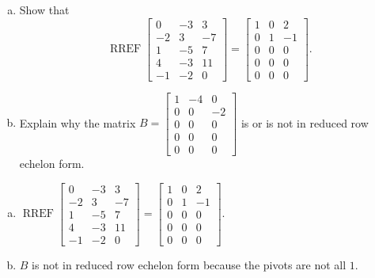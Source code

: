 
\begin{exerciseStatement}

\begin{enumerate}[(a)]
\item Show that \[\operatorname{RREF} \left[\begin{array}{ccc}
0 & -3 & 3 \\
-2 & 3 & -7 \\
1 & -5 & 7 \\
4 & -3 & 11 \\
-1 & -2 & 0
\end{array}\right] = \left[\begin{array}{ccc}
1 & 0 & 2 \\
0 & 1 & -1 \\
0 & 0 & 0 \\
0 & 0 & 0 \\
0 & 0 & 0
\end{array}\right] .\]
\item Explain why the matrix \(B= \left[\begin{array}{ccc}
1 & -4 & 0 \\
0 & 0 & -2 \\
0 & 0 & 0 \\
0 & 0 & 0 \\
0 & 0 & 0
\end{array}\right] \) is or is not in reduced row echelon form.
\end{enumerate}
    
\end{exerciseStatement}
    
\begin{exerciseAnswer} 

\begin{enumerate}[(a)]
\item \(\operatorname{RREF} \left[\begin{array}{ccc}
0 & -3 & 3 \\
-2 & 3 & -7 \\
1 & -5 & 7 \\
4 & -3 & 11 \\
-1 & -2 & 0
\end{array}\right] = \left[\begin{array}{ccc}
1 & 0 & 2 \\
0 & 1 & -1 \\
0 & 0 & 0 \\
0 & 0 & 0 \\
0 & 0 & 0
\end{array}\right] .\)
\item \(B\) is not in reduced row echelon form because the pivots are not all \(1\). 
\end{enumerate}
    
\end{exerciseAnswer}
    
